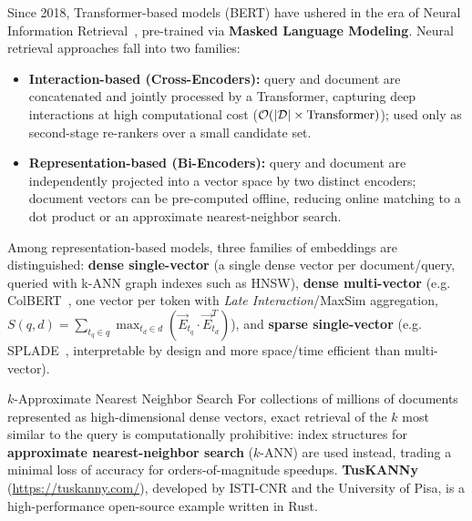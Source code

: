 Since 2018, Transformer-based models (BERT) have ushered in the era of Neural Information Retrieval~\cite{khattab2020,formal2021}, pre-trained via \textbf{Masked Language Modeling}. Neural retrieval approaches fall into two families:
\begin{itemize}
    \item \textbf{Interaction-based (Cross-Encoders):} query and document are concatenated and jointly processed by a Transformer, capturing deep interactions at high computational cost ($\mathcal{O}\!\left(|\mathcal{D}| \times \text{Transformer}\right)$); used only as second-stage re-rankers over a small candidate set.
    \item \textbf{Representation-based (Bi-Encoders):} query and document are independently projected into a vector space by two distinct encoders; document vectors can be pre-computed offline, reducing online matching to a dot product or an approximate nearest-neighbor search.
\end{itemize}

Among representation-based models, three families of embeddings are distinguished: \textbf{dense single-vector} (a single dense vector per document/query, queried with k-ANN graph indexes such as HNSW), \textbf{dense multi-vector} (e.g. ColBERT~\cite{khattab2020}, one vector per token with \textit{Late Interaction}/MaxSim aggregation, $S(q,d) = \sum_{t_q \in q} \max_{t_d \in d} (\vec{E}_{t_q} \cdot \vec{E}_{t_d}^T)$), and \textbf{sparse single-vector} (e.g. SPLADE~\cite{formal2021}, interpretable by design and more space/time efficient than multi-vector).

\begin{noteblock}{$k$-Approximate Nearest Neighbor Search}
For collections of millions of documents represented as high-dimensional dense vectors, exact retrieval of the $k$ most similar to the query is computationally prohibitive: index structures for \textbf{approximate nearest-neighbor search} ($k$-ANN) are used instead, trading a minimal loss of accuracy for orders-of-magnitude speedups. \textbf{TusKANNy} (\url{https://tuskanny.com/}), developed by ISTI-CNR and the University of Pisa, is a high-performance open-source example written in Rust.
\end{noteblock}
